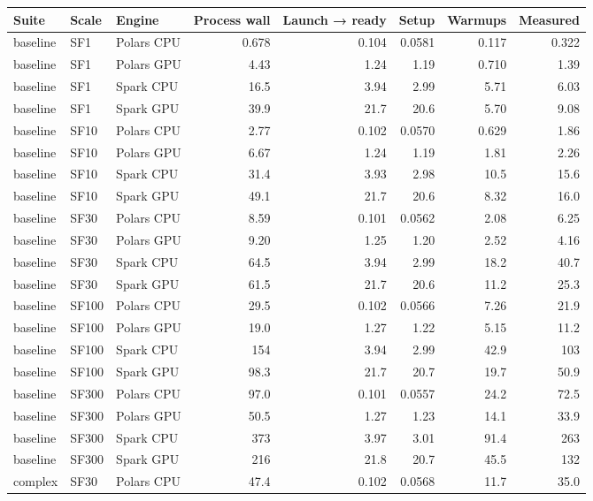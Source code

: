 \begin{longtable}{lllrrrrr}
\toprule
Suite & Scale & Engine & Process wall & Launch → ready & Setup & Warmups & Measured \\
\midrule
\endhead
\bottomrule
\endfoot
baseline & SF1 & Polars CPU & 0.678 & 0.104 & 0.0581 & 0.117 & 0.322 \\
baseline & SF1 & Polars GPU & 4.43 & 1.24 & 1.19 & 0.710 & 1.39 \\
baseline & SF1 & Spark CPU & 16.5 & 3.94 & 2.99 & 5.71 & 6.03 \\
baseline & SF1 & Spark GPU & 39.9 & 21.7 & 20.6 & 5.70 & 9.08 \\
baseline & SF10 & Polars CPU & 2.77 & 0.102 & 0.0570 & 0.629 & 1.86 \\
baseline & SF10 & Polars GPU & 6.67 & 1.24 & 1.19 & 1.81 & 2.26 \\
baseline & SF10 & Spark CPU & 31.4 & 3.93 & 2.98 & 10.5 & 15.6 \\
baseline & SF10 & Spark GPU & 49.1 & 21.7 & 20.6 & 8.32 & 16.0 \\
baseline & SF30 & Polars CPU & 8.59 & 0.101 & 0.0562 & 2.08 & 6.25 \\
baseline & SF30 & Polars GPU & 9.20 & 1.25 & 1.20 & 2.52 & 4.16 \\
baseline & SF30 & Spark CPU & 64.5 & 3.94 & 2.99 & 18.2 & 40.7 \\
baseline & SF30 & Spark GPU & 61.5 & 21.7 & 20.6 & 11.2 & 25.3 \\
baseline & SF100 & Polars CPU & 29.5 & 0.102 & 0.0566 & 7.26 & 21.9 \\
baseline & SF100 & Polars GPU & 19.0 & 1.27 & 1.22 & 5.15 & 11.2 \\
baseline & SF100 & Spark CPU & 154 & 3.94 & 2.99 & 42.9 & 103 \\
baseline & SF100 & Spark GPU & 98.3 & 21.7 & 20.7 & 19.7 & 50.9 \\
baseline & SF300 & Polars CPU & 97.0 & 0.101 & 0.0557 & 24.2 & 72.5 \\
baseline & SF300 & Polars GPU & 50.5 & 1.27 & 1.23 & 14.1 & 33.9 \\
baseline & SF300 & Spark CPU & 373 & 3.97 & 3.01 & 91.4 & 263 \\
baseline & SF300 & Spark GPU & 216 & 21.8 & 20.7 & 45.5 & 132 \\
complex & SF30 & Polars CPU & 47.4 & 0.102 & 0.0568 & 11.7 & 35.0 \\

\end{longtable}
